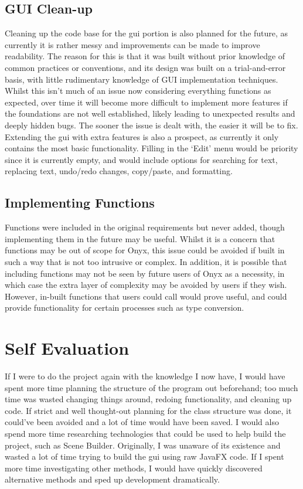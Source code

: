 \documentclass[
]{report}
\begin{document}
\subsection{GUI Clean-up}
Cleaning up the code base for the \acrshort{gui} portion is also planned for the
future, as currently it is rather messy and improvements can be made to improve readability. 
The reason for this is that it was built without prior knowledge of common
practices or conventions, and its design was built on a trial-and-error basis, 
with little rudimentary knowledge of GUI implementation techniques.
Whilst this isn't much of an issue now considering everything functions
as expected, over time it will become more difficult to implement more
features if the foundations are not well established, likely leading to unexpected
results and deeply hidden bugs. The sooner the issue is dealt with,
the easier it will be to fix. Extending the \acrshort{gui} with extra features is
also a prospect, as currently it only contains the most basic
functionality. Filling in the `Edit' menu would be priority since it is
currently empty, and would include options for searching for text,
replacing text, undo/redo changes, copy/paste, and formatting.

\subsection{Implementing Functions}
Functions were included in the original requirements but never added,
though implementing them in the future may be useful. Whilst it is a
concern that functions may be out of scope for Onyx, this issue could be
avoided if built in such a way that is not too intrusive or complex.
In addition, it is possible that including functions may not be seen by 
future users of Onyx as a necessity, in which case the extra layer of complexity 
may be avoided by users if they wish. However, in-built functions that users could call
would prove useful, and could provide functionality for certain
processes such as type conversion.

\section{Self Evaluation}
If I were to do the project again with the knowledge I now have, I would
have spent more time planning the structure of the program out
beforehand; too much time was wasted changing things around, redoing
functionality, and cleaning up code. If strict and well thought-out
planning for the class structure was done, it could've been avoided and
a lot of time would have been saved. I would also spend more time
researching technologies that could be used to help build the project,
such as Scene Builder. Originally, I was unaware of its existence and
wasted a lot of time trying to build the \acrshort{gui} using raw JavaFX code. If I
spent more time investigating other methods, I would have quickly
discovered alternative methods and sped up development dramatically.
\end{document}
